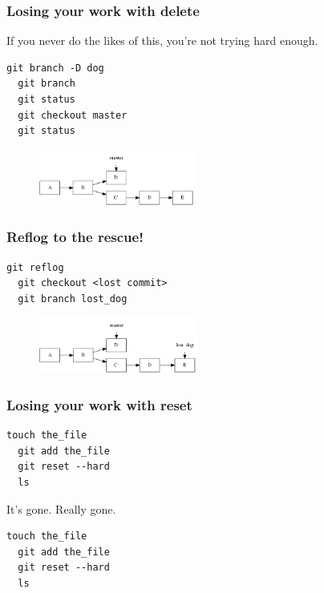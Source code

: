 \documentclass{beamer}
\begin{document}
\begin{frame}[fragile]
\frametitle{Losing your work with delete}

If you never do the likes of this, you're not trying hard enough.

\vspace{1em}

\begin{lstlisting}[frame=single]
  git branch -D dog
  git branch
  git status
  git checkout master
  git status
\end{lstlisting}

\vspace{1em}

\begin{figure}[p]
  \centering
  \includegraphics[height=5em]{gone.png}
\end{figure}

\end{frame}


\begin{frame}[fragile]
\frametitle{Reflog to the rescue!}

\vspace{1em}

\begin{lstlisting}[frame=single]
  git reflog
  git checkout <lost commit>
  git branch lost_dog
\end{lstlisting}

\vspace{1em}

\begin{figure}[p]
  \centering
  \includegraphics[height=5em]{returned.png}
\end{figure}

\end{frame}

\begin{frame}[fragile]
\frametitle{Losing your work with reset}

\begin{lstlisting}[frame=single]
  touch the_file
  git add the_file
  git reset --hard
  ls
\end{lstlisting}

\vspace{1em}

It's gone. Really gone.

\begin{lstlisting}[frame=single]
  touch the_file
  git add the_file
  git reset --hard
  ls
\end{lstlisting}

\end{frame}
\end{document}
